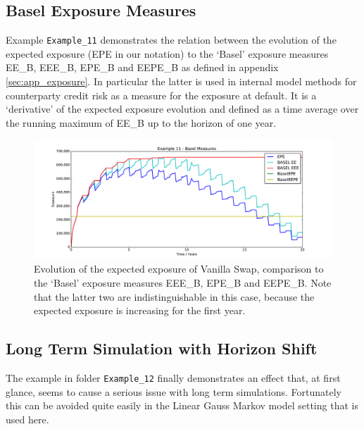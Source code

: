 \documentclass[12pt, a4paper]{article}
\begin{document}
\subsection{Basel Exposure Measures}\label{sec:basel}

Example {\tt Example\_11} demonstrates the relation between the evolution of the expected exposure (EPE in our notation)
to the `Basel' exposure measures EE\_B, EEE\_B, EPE\_B and EEPE\_B as defined in appendix \ref{sec:app_exposure}. In
particular the latter is used in internal model methods for counterparty credit risk as a measure for the exposure at
default. It is a `derivative' of the expected exposure evolution and defined as a time average over the running maximum
of EE\_B up to the horizon of one year.
\begin{figure}[h!]
\begin{center}
\includegraphics[scale=0.45]{mpl_basel_exposures.pdf}
\end{center}
\caption{Evolution of the expected exposure of Vanilla Swap, comparison to the `Basel' exposure measures EEE\_B, EPE\_B and EEPE\_B. Note that the latter two are indistinguishable in this case, because the expected exposure is increasing for the first year.}
\label{fig_14}
\end{figure}

\subsection{Long Term Simulation with Horizon Shift}\label{sec:longterm}

The example in folder {\tt Example\_12} finally demonstrates an effect that, at first glance, seems to cause a serious
issue with long term simulations. Fortunately this can be avoided quite easily in the Linear Gauss Markov model setting
that is used here. \\
\end{document}

